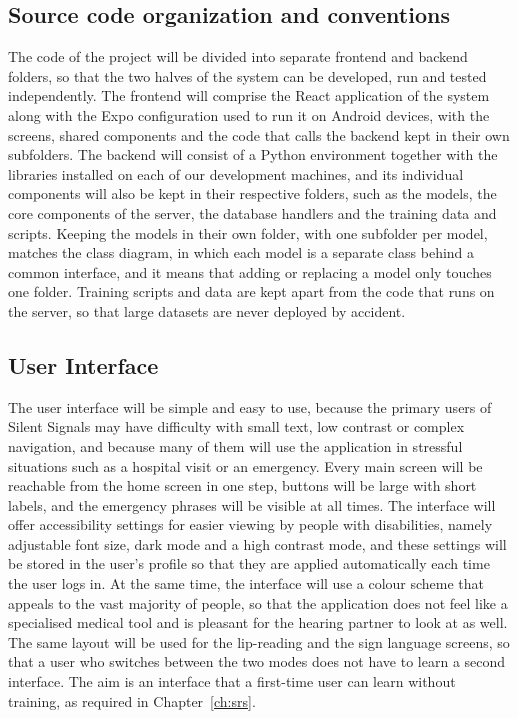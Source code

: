 \documentclass{FastFyp}
\begin{document}
\subsection{Source code organization and conventions}
The code of the project will be divided into separate frontend and backend folders, so that the two halves of the system can be developed, run and tested independently. The frontend will comprise the React application of the system along with the Expo configuration used to run it on Android devices, with the screens, shared components and the code that calls the backend kept in their own subfolders. The backend will consist of a Python environment together with the libraries installed on each of our development machines, and its individual components will also be kept in their respective folders, such as the models, the core components of the server, the database handlers and the training data and scripts. Keeping the models in their own folder, with one subfolder per model, matches the class diagram, in which each model is a separate class behind a common interface, and it means that adding or replacing a model only touches one folder. Training scripts and data are kept apart from the code that runs on the server, so that large datasets are never deployed by accident.

\subsection{User Interface}
The user interface will be simple and easy to use, because the primary users of Silent Signals may have difficulty with small text, low contrast or complex navigation, and because many of them will use the application in stressful situations such as a hospital visit or an emergency. Every main screen will be reachable from the home screen in one step, buttons will be large with short labels, and the emergency phrases will be visible at all times. The interface will offer accessibility settings for easier viewing by people with disabilities, namely adjustable font size, dark mode and a high contrast mode, and these settings will be stored in the user's profile so that they are applied automatically each time the user logs in. At the same time, the interface will use a colour scheme that appeals to the vast majority of people, so that the application does not feel like a specialised medical tool and is pleasant for the hearing partner to look at as well. The same layout will be used for the lip-reading and the sign language screens, so that a user who switches between the two modes does not have to learn a second interface. The aim is an interface that a first-time user can learn without training, as required in Chapter~\ref{ch:srs}.
\end{document}
